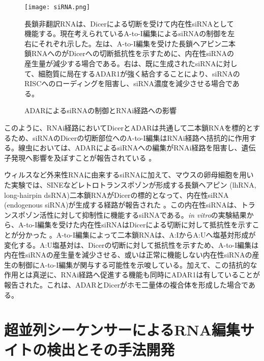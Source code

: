 \begin{figure}[!h]
	\begin{center}
		\texttt{[image: siRNA.png]}
	\end{center}
	\caption{ADARによるsiRNAの制御とRNAi経路への影響}
	\begin{flushleft}
		\small{長鎖非翻訳RNAは、Dicerによる切断を受けて内在性siRNAとして機能する。現在考えられているA-to-I編集によるsiRNAの制御を左右にそれぞれ示した。左は、A-to-I編集を受けた長鎖ヘアピン二本鎖RNAへのがDicerへの切断抵抗性を示すために、内在性siRNAの産生量が減少する場合である。右は、既に生成されたsiRNAに対して、細胞質に局在するADAR1が強く結合することにより、siRNAのRISCへのローディングを阻害し、siRNA濃度を減少させる場合である。}
	\end{flushleft}
	\label{fig:adar_siRNA}
\end{figure}

このように、RNAi経路においてDicerとADARは共通して二本鎖RNAを標的とするため、siRNAのDicerの切断部位へのA-to-I編集はRNAi経路へ拮抗的に作用する。線虫においては、ADARによるsiRNAへの編集がRNAi経路を阻害し、遺伝子発現へ影響を及ぼすことが報告されている \citep{KniBas0210}。
\par
ウィルスなど外来性RNAに由来するsiRNAに加えて、マウスの卵母細胞を用いた実験では、SINEなどレトロトランスポゾンが形成する長鎖ヘアピン (lhRNA, long-hairpin dsRNA)二本鎖RNAがDicerの標的となって、内在性siRNA (endogenous siRNA)が生成する経路が報告された \citep{Watanabe:2008aa}。この内在性siRNAは、トランスポゾン活性に対して抑制性に機能するsiRNAである。\textit{in vitro}の実験結果から、A-to-I編集を受けた内在性siRNAはDicerによる切断に対して抵抗性を示すことが分かった \citep{ScaSmi0112}。A-to-I編集によって二本鎖RNAは、A:IからA:Uへ塩基対形成が変化する。A:U塩基対は、Dicerの切断に対して抵抗性を示すため、A-to-I編集は内在性siRNAの産生量を減少させる、或いは正常に機能しない内在性siRNAの産生の制御にA-to-I編集が関与する可能性を示唆している。加えて、この拮抗的な作用とは真逆に、RNAi経路へ促進する機能も同時にADAR1は有していることが報告された。これは、ADARとDicerがホモ二量体の複合体を形成した場合である。

\section{超並列シーケンサーによるRNA編集サイトの検出とその手法開発}
